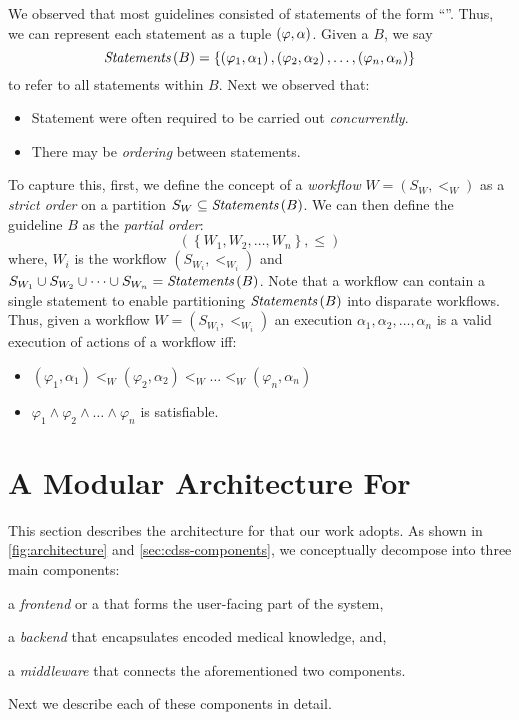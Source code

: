 We observed that most guidelines consisted of statements of the
form ``''.
Thus, we can represent each statement as a tuple ${\left(\varphi, \alpha\right)}{}$.
Given a \BPG{} $B$, we say
\[
\textit{Statements}\left(B\right) =
\left\{\left(\varphi_1,\alpha_1\right),\left(\varphi_2,\alpha_2\right),\dots,\left(\varphi_n,\alpha_n\right)\right\}
\]
to refer to all statements within $B$. Next we observed that:
\begin{itemize}
  \item Statement were often required to be carried out \emph{concurrently}.
  \item There may be \emph{ordering} between statements.
\end{itemize}
To capture this, first, we define the concept of a \emph{workflow}
$W = \left(S_W, <_W\right)$ as a \emph{strict order} on a partition $S_W \subseteq \textit{Statements}\left(B\right)$.
We can then define the guideline $B$ as the \emph{partial order}:
\[
  \left(\left\{W_1,W_2,\dots,W_n\right\}, \leq\right)
\]
where, $W_i$ is the workflow $\left(S_{W_i}, <_{W_i}\right)$ and
$S_{W_1} \cup S_{W_2} \cup \dots \cup S_{W_n} = \textit{Statements}\left(B\right)$. Note that a
workflow can contain a single statement to enable partitioning $\textit{Statements}\left(B\right)$
into disparate workflows. Thus, given a workflow $W =\left(S_{W_i},
    <_{W_i}\right)$  an execution
$\alpha_1,\alpha_2,\dots,\alpha_n$ is a valid execution of actions of a workflow iff:
\begin{itemize}
  \item $\left(\varphi_1,\alpha_1\right) <_W \left(\varphi_2,\alpha_2\right) <_W
  \dots <_W \left(\varphi_n,\alpha_n\right)$
  \item $\varphi_1 \wedge \varphi_2 \wedge \dots \wedge \varphi_n$ is satisfiable.
\end{itemize}

\section{A Modular Architecture For \CDSSs{}}
This section describes the architecture for \CDSSs{}
that our work adopts. As shown in \figurename{} \ref{fig:architecture}
and \autoref{sec:cdss-components}, we conceptually
decompose \CDSSs{} into three main components:
\begin{enumerate*}[label=(\roman*)]
    \item a \emph{frontend} or a \UI{} that forms the user-facing part of the system,
    \item a \emph{backend} that encapsulates encoded medical knowledge, and,
    \item a \emph{middleware} that connects the aforementioned two components.
\end{enumerate*}
Next we describe each of these components in detail.

